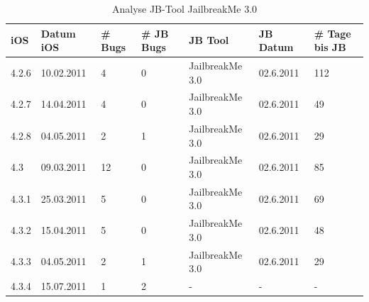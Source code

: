 \begin{table}[htp!]
    \begin{center}
        \begin{tabular}{| p{10mm} | p{18mm} | p{17mm} | p{25mm} | p{32mm} | p{22mm} | p{15mm} |} \hline
            \textbf{iOS} & \textbf{Datum iOS} & \textbf{\# Bugs} & \textbf{\# JB Bugs} & \textbf{JB Tool} & \textbf{JB Datum} & \textbf{\# Tage bis JB} \\ \hline 
            4.2.6 & 10.02.2011 & 4 & 0 & JailbreakMe 3.0 & 02.6.2011 & 112 \\ \hline
            4.2.7 & 14.04.2011 & 4 & 0 & JailbreakMe 3.0 & 02.6.2011 & 49 \\ \hline
            4.2.8 & 04.05.2011 & 2 & 1 & JailbreakMe 3.0 & 02.6.2011 & 29 \\ \hline
            4.3 & 09.03.2011 & 12 & 0 & JailbreakMe 3.0 &	02.6.2011 & 85 \\ \hline
            4.3.1 & 25.03.2011 & 5 & 0 & JailbreakMe 3.0 & 02.6.2011 & 69 \\ \hline
            4.3.2 & 15.04.2011 & 5 & 0 & JailbreakMe 3.0 & 02.6.2011 & 48 \\ \hline
            4.3.3 & 04.05.2011 & 2 & 1 & JailbreakMe 3.0 & 02.6.2011 & 29 \\ \hline
            4.3.4 & 15.07.2011 & 1 & 2	 & - & - & - \\ \hline
        \end{tabular} 
        \caption{Analyse JB-Tool JailbreakMe 3.0}
        \label{tab:AnalyseJailbreakMe3.0}
    \end{center}
\end{table}


